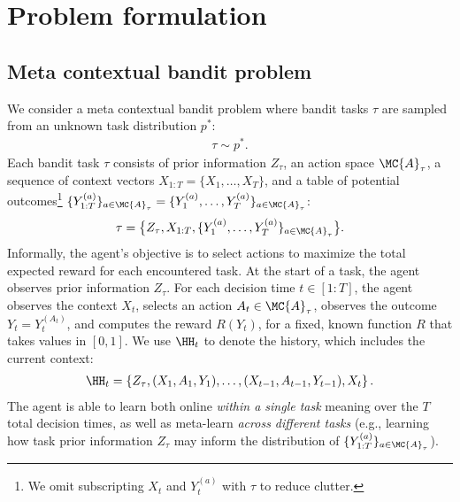 \section{Problem formulation}
\label{sec:probFormulation}
\subsection{Meta contextual bandit problem}
We consider a meta contextual bandit problem where bandit tasks $\tau$ are sampled from an unknown task distribution $p^*$:
\begin{align}
    \tau \sim p^*.
    \label{eqn:taskDist}
\end{align}
Each bandit task $\tau$ consists of prior information $Z_{\tau}$, an action space $\MC{A}_{\tau}$, a sequence of context vectors $X_{1:T} = \{ X_1, \dots, X_T \}$, and a table of potential outcomes\footnote{We omit subscripting $X_t$ and $Y_t^{(a)}$ with $\tau$ to reduce clutter.} $\{ Y_{1:T}^{(a)} \}_{a \in \MC{A}_{\tau}} = \{ Y_1^{(a)}, \dots, Y_T^{(a)} \}_{a \in \MC{A}_{\tau}}$:
\begin{align*}
    \tau = \big\{ Z_{\tau}, X_{1:T}, \{ Y_1^{(a)}, \dots, Y_T^{(a)} \}_{a \in \MC{A}_{\tau}} \big\}.
\end{align*}
Informally, the agent's objective is to select actions to maximize the total expected reward for each encountered task. 
At the start of a task, the agent observes prior information $Z_{\tau}$. For each decision time $t \in [1 \colon T]$, the agent observes the context $X_t$, selects an action $A_t \in \MC{A}_{\tau}$, observes the outcome $Y_t = Y_t^{(A_t)}$, and computes the reward $R(Y_t)$, for a fixed, known function $R$ that takes values in $[0,1]$. We use $\HH_t$ to denote the history, which includes the current context:
\begin{align*}
    \HH_t = \left\{ Z_{\tau}, (X_1, A_1, Y_1),  \dots, (X_{t-1}, A_{t-1}, Y_{t-1}), X_t \right\}.
\end{align*}
The agent is able to learn both online \textit{within a single task} meaning over the $T$ total decision times, as well as meta-learn \textit{across different tasks} (e.g., learning how task prior information $Z_{\tau}$ may inform the distribution of $\{ Y_{1:T}^{(a)} \}_{a \in \MC{A}_{\tau}}$).

